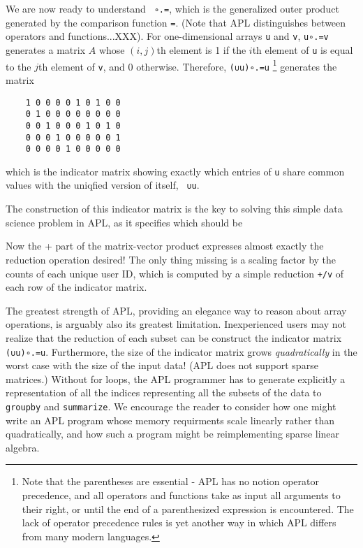 \documentclass[fleqn,10pt,lineno]{wlpeerj} %
\begin{document}
We are now ready to understand \lstinline| ∘.=|, which is the generalized outer
product generated by the comparison function \lstinline|=|. (Note that APL
distinguishes between operators and functions...XXX). For one-dimensional arrays
\lstinline|u| and \lstinline|v|, \lstinline|u∘.=v| generates a matrix $A$ whose
$(i,j)$th element is 1 if the $i$th element of \lstinline|u| is equal to the
$j$th element of \lstinline|v|, and 0 otherwise. Therefore, \lstinline|(∪u)∘.=u|
\footnote{Note that the parentheses are essential - APL has no notion operator precedence, and
all operators and functions take as input all arguments to their right, or until
the end of a parenthesized expression is encountered. The lack of operator precedence rules is yet another way in which APL differs from many modern languages.}
generates the matrix
%
\begin{lstlisting}
    1 0 0 0 0 1 0 1 0 0
    0 1 0 0 0 0 0 0 0 0
    0 0 1 0 0 0 1 0 1 0
    0 0 0 1 0 0 0 0 0 1
    0 0 0 0 1 0 0 0 0 0
\end{lstlisting}
%
which is the indicator matrix showing exactly which entries of \lstinline|u|
share common values with the uniqfied version of itself, \lstinline| ∪u|.

The construction of this indicator matrix is the key to solving this simple data science problem in APL, as it specifies which should be

Now the + part of the matrix-vector product expresses almost exactly the reduction operation desired! The only thing missing is a scaling factor by the counts of each unique user ID, which is computed by a simple reduction \lstinline|+/v| of each row of the indicator matrix.

The greatest strength of APL, providing an elegance way to reason about array operations, is arguably also its greatest limitation. Inexperienced users may not realize that the reduction of each subset can be  construct the indicator matrix \lstinline|(∪u)∘.=u|. Furthermore, the size of the indicator matrix grows \textit{quadratically} in the worst case with the size of the input data! (APL does not support sparse matrices.) Without for loops, the APL programmer has to generate explicitly a representation of all the indices representing all the subsets of the data to \lstinline|groupby| and \lstinline|summarize|. We encourage the reader to consider how one might write an APL program whose memory requirments scale linearly rather than quadratically, and how such a program might be reimplementing sparse linear algebra.
\end{document}
